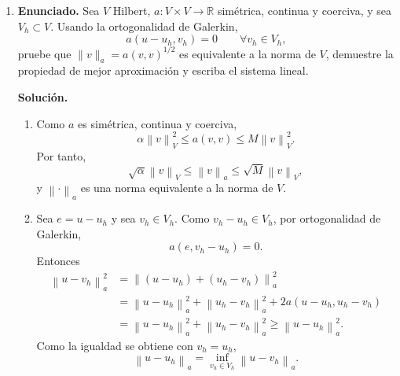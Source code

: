 \documentclass[11pt]{article}
\newcommand{\norm}[1]{\left\lVert #1\right\rVert}
\def\R{\mathbb R}
\def\dx{\mbox{\(\,\mathrm{d}x\)}}
\def\ds{\mbox{\(\,\mathrm{d}s\)}}
\begin{document}
\begin{enumerate}[label=\textbf{\arabic*.}, leftmargin=*]
\begin{enumerate}[label=(\alph*)]
        \item Para $g\in H^{1/2}(\Gamma_D)$, tomamos un lifting $G\in H^1(\Omega)$ tal que
        \[
            \gamma_0G=g\quad\text{en }\Gamma_D.
        \]
        Buscamos $u=u_0+G$, con $u_0\in V$. Al reemplazar en la formulación débil,
        \[
            a(u_0+G,v)=\ell(v)\qquad\forall v\in V.
        \]
        Por tanto, $u_0$ satisface
        \[
            a(u_0,v)=\widetilde\ell(v)\qquad\forall v\in V,
        \]
        donde
        \[
            \widetilde\ell(v)=\ell(v)-a(G,v).
        \]
        Es decir,
        \[
        \begin{aligned}
            \widetilde\ell(v)
            &=
            \int_\Omega fv\dx+\langle r,\gamma_0v\rangle_{\Gamma_R}
            -\int_\Omega \nabla G\cdot\nabla v\dx
            -\int_\Omega cGv\dx
            -\int_{\Gamma_R}\beta\,\gamma_0G\,\gamma_0v\ds.
        \end{aligned}
        \]
        Como $a$ es continua y coerciva en $V$, y $\widetilde\ell\in V'$, Lax--Milgram entrega un único $u_0\in V$. Entonces $u=u_0+G\in V_g$ existe y es único. En efecto, si dos soluciones en $V_g$ existieran, su diferencia pertenecería a $V$ y resolvería el problema homogéneo, luego sería cero por coercividad.
    \end{enumerate}

    \item \textbf{Enunciado.} Sea $V$ Hilbert, $a:V\times V\to\R$ simétrica, continua y coerciva, y sea $V_h\subset V$. Usando la ortogonalidad de Galerkin,
    \[
        a(u-u_h,v_h)=0\qquad\forall v_h\in V_h,
    \]
    pruebe que $\|v\|_a=a(v,v)^{1/2}$ es equivalente a la norma de $V$, demuestre la propiedad de mejor aproximación y escriba el sistema lineal.

    \textbf{Solución.}
    \begin{enumerate}[label=(\alph*)]
        \item Como $a$ es simétrica, continua y coerciva,
        \[
            \alpha\norm{v}_V^2\le a(v,v)\le M\norm{v}_V^2.
        \]
        Por tanto,
        \[
            \sqrt{\alpha}\norm{v}_V\le \norm{v}_a\le \sqrt M\norm{v}_V,
        \]
        y $\norm{\cdot}_a$ es una norma equivalente a la norma de $V$.

        \item Sea $e=u-u_h$ y sea $v_h\in V_h$. Como $v_h-u_h\in V_h$, por ortogonalidad de Galerkin,
        \[
            a(e,v_h-u_h)=0.
        \]
        Entonces
        \begin{align*}
            \norm{u-v_h}_a^2
            &=
            \norm{(u-u_h)+(u_h-v_h)}_a^2\\
            &=
            \norm{u-u_h}_a^2
            +\norm{u_h-v_h}_a^2
            +2a(u-u_h,u_h-v_h)\\
            &=
            \norm{u-u_h}_a^2+\norm{u_h-v_h}_a^2
            \ge \norm{u-u_h}_a^2.
        \end{align*}
        Como la igualdad se obtiene con $v_h=u_h$,
        \[
            \norm{u-u_h}_a=\inf_{v_h\in V_h}\norm{u-v_h}_a.
        \]


\end{enumerate}
\end{enumerate}
\end{document}
